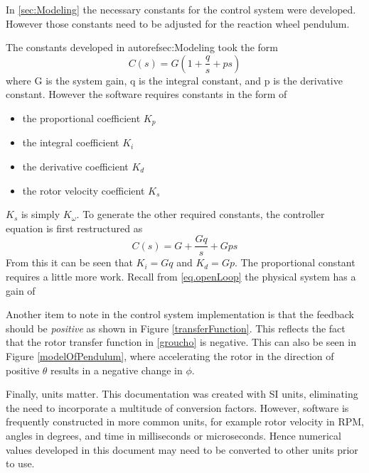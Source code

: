 \documentclass[12pt,letterpaper]{article}
\begin{document}
In \autoref{sec:Modeling} the necessary constants for the control system were developed.  However those constants
need to be adjusted for the reaction wheel pendulum.

The constants developed in autoref{sec:Modeling} took the form
\begin{equation}
	C(s) = G(1 + \frac{q}{s} + p s)
\end{equation}
where G is the system gain, q is the integral constant, and p is the derivative constant.  However the software requires
constants in the form of 
\begin{itemize}
    \item the proportional coefficient $K_{p}$
    \item the integral coefficient $K_{i}$
    \item the derivative coefficient $K_{d}$
    \item the rotor velocity coefficient $K_{s}$
\end{itemize}

$K_{s}$ is simply $K_{\omega}$.  To generate the other required constants, the controller equation is first restructured as
\begin{equation}
	C(s) = G + \frac{Gq}{s} + Gps
\end{equation}
From this it can be seen that $K_{i} = Gq$ and $K_{d} = Gp$.  The proportional constant requires a little more work.
Recall from \eqref{eq.openLoop} the physical system has a gain of 

Another item to note in the control system implementation is that the feedback should be \textit{positive} as shown in Figure \ref{transferFunction}.  This reflects the fact that the rotor transfer function in \eqref{groucho} is negative.  This can also be seen in Figure \ref{modelOfPendulum}, where accelerating the rotor in the direction of positive $\theta$ results in a negative change in $\phi$.

Finally, units matter.  This documentation was created with SI units, eliminating the need to incorporate a multitude of conversion factors.  However, software is frequently constructed in more common units, for example rotor velocity in RPM, angles in degrees, and time in milliseconds or microseconds.  Hence numerical values developed in this document may need to
be converted to other units prior to use.
\end{document}
